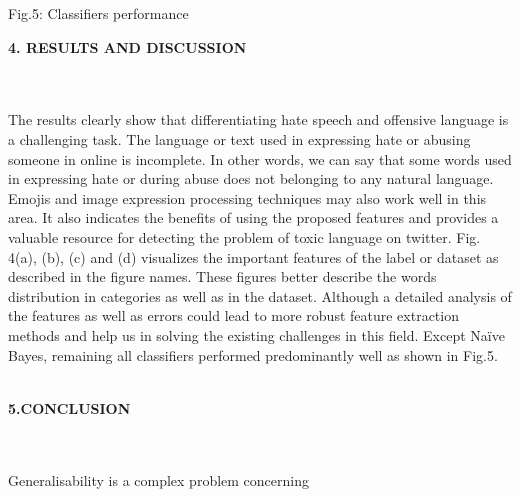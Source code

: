 \documentclass{letter}
\begin{document}
\begin{multicols}{2}
\begin{tiny}
\end{tiny}
\begin{center}
Fig.5: Classifiers performance 
\end{center}
\begin{large}{\textbf{4. RESULTS AND DISCUSSION}}\end{large} \\ \\   \newline \newline
The results clearly show that differentiating hate 
speech and offensive language is a challenging task. The 
language or text used in expressing hate or abusing\\ 
someone in online is incomplete. In other words, we can 
say that some words used in expressing hate or during 
abuse does not belonging to any natural language. 
Emojis and image expression processing techniques 
may also work well in this area. It also indicates the 
benefits of using the proposed features and provides a 
valuable resource for detecting the problem of toxic 
language on twitter. Fig. 4(a), (b), (c) and (d) visualizes 
the important features of the label or dataset as 
described in the figure names. These figures better 
describe the words distribution in categories as well as 
in the dataset. Although a detailed analysis of the 
features as well as errors could lead to more robust 
feature extraction methods and help us in solving the 
existing challenges in this field. Except Naïve Bayes, 
remaining all classifiers performed predominantly well 
as shown in Fig.5.\\ \\
\begin{large}{\textbf{5.CONCLUSION}}\end{large} \\ \\ 
Generalisability is a complex problem concerning 

\end{multicols}
\end{document}
